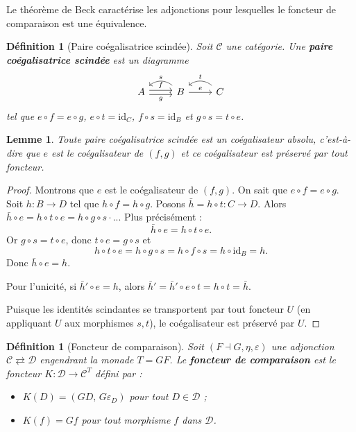 \documentclass[a4paper,12pt]{book}
\newcommand{\id}{\mathrm{id}}
\newtheorem{lemme}[theoreme]{Lemme}
\newtheorem{definition}[theoreme]{Définition}
\begin{document}
Le théorème de Beck caractérise les adjonctions
pour lesquelles le foncteur de comparaison est une équivalence.

\begin{definition}[Paire coégalisatrice scindée]\label{def:paire-coeg-scindee}
Soit $\mathcal{C}$ une catégorie.
Une \textbf{paire coégalisatrice scindée} est un diagramme
\[
\begin{tikzcd}
A \arrow[r, shift left=0.5ex, "f"] \arrow[r, shift right=0.5ex, "g"'] &
B \arrow[r, "e"] \arrow[l, bend right=40, "s"'] &
C \arrow[l, bend right=40, "t"']
\end{tikzcd}
\]
tel que $e \circ f = e \circ g$, $e \circ t = \id_C$,
$f \circ s = \id_B$ et $g \circ s = t \circ e$.
\end{definition}

\begin{lemme}\label{lem:coeg-scindee-absolue}
Toute paire coégalisatrice scindée est un coégalisateur absolu,
c'est-à-dire que $e$ est le coégalisateur de $(f, g)$ et ce coégalisateur
est préservé par tout foncteur.
\end{lemme}

\begin{proof}
Montrons que $e$ est le coégalisateur de $(f, g)$.
On sait que $e \circ f = e \circ g$.
Soit $h \colon B \to D$ tel que $h \circ f = h \circ g$.
Posons $\bar{h} = h \circ t \colon C \to D$. Alors
$\bar{h} \circ e = h \circ t \circ e = h \circ g \circ s \cdot$...
Plus précisément :
\[
    \bar{h} \circ e = h \circ t \circ e.
\]
Or $g \circ s = t \circ e$, donc $t \circ e = g \circ s$ et
\[
    h \circ t \circ e = h \circ g \circ s = h \circ f \circ s = h \circ \id_B = h.
\]
Donc $\bar{h} \circ e = h$.

Pour l'unicité, si $\bar{h}' \circ e = h$, alors
$\bar{h}' = \bar{h}' \circ e \circ t = h \circ t = \bar{h}$.

Puisque les identités scindantes se transportent par tout foncteur $U$
(en appliquant $U$ aux morphismes $s, t$),
le coégalisateur est préservé par $U$.
\end{proof}

\begin{definition}[Foncteur de comparaison]\label{def:foncteur-comparaison}
Soit $(F \dashv G, \eta, \varepsilon)$ une adjonction
$\mathcal{C} \rightleftarrows \mathcal{D}$ engendrant la monade $T = GF$.
Le \textbf{foncteur de comparaison} est le foncteur
$K \colon \mathcal{D} \to \mathcal{C}^T$ défini par :
\begin{itemize}
    \item $K(D) = (GD,\, G\varepsilon_D)$ pour tout $D \in \mathcal{D}$ ;
    \item $K(f) = Gf$ pour tout morphisme $f$ dans $\mathcal{D}$.
\end{itemize}
\end{definition}
\end{document}
